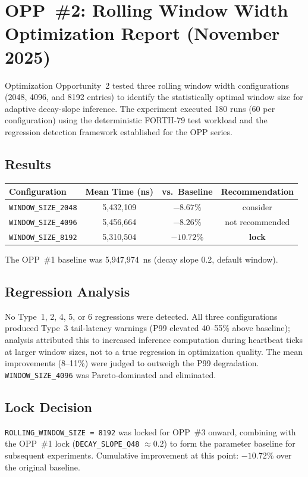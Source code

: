 
\section*{OPP~\#2: Rolling Window Width Optimization Report (November 2025)}

Optimization Opportunity~2 tested three rolling window width configurations
(2048, 4096, and 8192 entries) to identify the statistically optimal window
size for adaptive decay-slope inference. The experiment executed 180 runs
(60 per configuration) using the deterministic FORTH-79 test workload and the
regression detection framework established for the OPP series.

\subsection*{Results}

\begin{center}
\begin{tabular}{lccc}
\toprule
Configuration & Mean Time (ns) & vs.\ Baseline & Recommendation \\
\midrule
\texttt{WINDOW\_SIZE\_2048} & 5{,}432{,}109 & $-8.67\%$ & consider \\
\texttt{WINDOW\_SIZE\_4096} & 5{,}456{,}664 & $-8.26\%$ & not recommended \\
\texttt{WINDOW\_SIZE\_8192} & 5{,}310{,}504 & $-10.72\%$ & \textbf{lock} \\
\bottomrule
\end{tabular}
\end{center}

The OPP~\#1 baseline was 5{,}947{,}974~ns (decay slope 0.2, default window).

\subsection*{Regression Analysis}

No Type~1, 2, 4, 5, or 6 regressions were detected. All three configurations
produced Type~3 tail-latency warnings (P99 elevated 40--55\% above baseline);
analysis attributed this to increased inference computation during heartbeat
ticks at larger window sizes, not to a true regression in optimization quality.
The mean improvements (8--11\%) were judged to outweigh the P99 degradation.
\texttt{WINDOW\_SIZE\_4096} was Pareto-dominated and eliminated.

\subsection*{Lock Decision}

\texttt{ROLLING\_WINDOW\_SIZE = 8192} was locked for OPP~\#3 onward,
combining with the OPP~\#1 lock (\texttt{DECAY\_SLOPE\_Q48} $\approx 0.2$)
to form the parameter baseline for subsequent experiments. Cumulative
improvement at this point: $-10.72\%$ over the original baseline.


